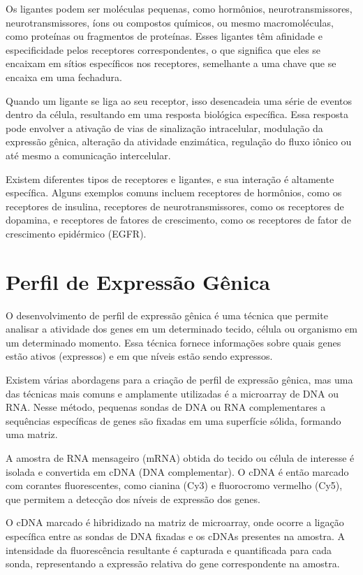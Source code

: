 \documentclass[11pt,a4paper]{article}
\newcounter{exemplo}
\begin{document}
		Os ligantes podem ser moléculas pequenas, como hormônios, neurotransmissores, neurotransmissores, íons ou compostos químicos, ou mesmo macromoléculas, como proteínas ou fragmentos de proteínas. Esses ligantes têm afinidade e especificidade pelos receptores correspondentes, o que significa que eles se encaixam em sítios específicos nos receptores, semelhante a uma chave que se encaixa em uma fechadura.
	
		Quando um ligante se liga ao seu receptor, isso desencadeia uma série de eventos dentro da célula, resultando em uma resposta biológica específica. Essa resposta pode envolver a ativação de vias de sinalização intracelular, modulação da expressão gênica, alteração da atividade enzimática, regulação do fluxo iônico ou até mesmo a comunicação intercelular.

		Existem diferentes tipos de receptores e ligantes, e sua interação é altamente específica. Alguns exemplos comuns incluem receptores de hormônios, como os receptores de insulina, receptores de neurotransmissores, como os receptores de dopamina, e receptores de fatores de crescimento, como os receptores de fator de crescimento epidérmico (EGFR).

	\section{Perfil de Expressão Gênica}

		O desenvolvimento de perfil de expressão gênica é uma técnica que permite analisar a atividade dos genes em um determinado tecido, célula ou organismo em um determinado momento. Essa técnica fornece informações sobre quais genes estão ativos (expressos) e em que níveis estão sendo expressos.

		Existem várias abordagens para a criação de perfil de expressão gênica, mas uma das técnicas mais comuns e amplamente utilizadas é a microarray de DNA ou RNA. Nesse método, pequenas sondas de DNA ou RNA complementares a sequências específicas de genes são fixadas em uma superfície sólida, formando uma matriz.
	
		A amostra de RNA mensageiro (mRNA) obtida do tecido ou célula de interesse é isolada e convertida em cDNA (DNA complementar). O cDNA é então marcado com corantes fluorescentes, como cianina (Cy3) e fluorocromo vermelho (Cy5), que permitem a detecção dos níveis de expressão dos genes.
	
		O cDNA marcado é hibridizado na matriz de microarray, onde ocorre a ligação específica entre as sondas de DNA fixadas e os cDNAs presentes na amostra. A intensidade da fluorescência resultante é capturada e quantificada para cada sonda, representando a expressão relativa do gene correspondente na amostra.
	
\end{document}
